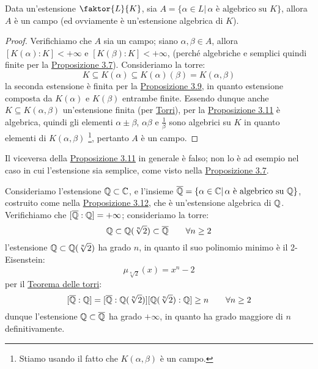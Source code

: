 \documentclass[11pt]{scrartcl}
\begin{document}
\begin{proposition}
    \label{3.12}
    Data un'estensione $\faktor{L}{K}$, sia $A = \{\alpha \in L | \, \text{$\alpha$ è algebrico su $K$}\}$, allora $A$ è un campo (ed ovviamente
    è un'estensione algebrica di $K$).
\end{proposition}

\begin{proof}
    Verifichiamo che $A$ sia un campo; siano $\alpha,\beta \in A$, allora $[K(\alpha):K] <+\infty$ e $[K(\beta):K]<+\infty$,
    (perché algebriche e semplici quindi finite per la \hyperref[3.7]{Proposizione 3.7}). Consideriamo la torre:
    \[ K \subseteq K(\alpha) \subseteq K(\alpha)(\beta) = K(\alpha,\beta)
        \]
    la seconda estensione è finita per la \hyperref[3.9]{Proposizione 3.9}, in quanto estensione composta da $K(\alpha)$ e $K(\beta)$ entrambe finite.
    Essendo dunque anche $K \subseteq K(\alpha,\beta)$ un'estensione finita (per \hyperref[torri]{Torri}), per la \hyperref[3.11]{Proposizione 3.11}
    è algebrica, quindi gli elementi $\alpha\pm\beta$, $\alpha\beta$ e $\displaystyle\frac{1}{\beta}$ sono algebrici su $K$ in quanto elementi di $K(\alpha,\beta)$ 
    \footnote{Stiamo usando il fatto che $K(\alpha,\beta)$ è un campo.}, pertanto $A$ è un campo.
\end{proof}

\begin{remark}
    Il viceversa della \hyperref[3.11]{Proposizione 3.11} in generale è falso; non lo è ad esempio nel caso in cui l'estensione sia semplice, come visto nella \hyperref[3.7]{Proposizione 3.7}.
\end{remark}

\begin{example}
    Consideriamo l'estensione $\mathbb Q \subset \mathbb C$, e l'insieme $\overline{\mathbb Q} = \{\alpha \in \mathbb C | \, \text{$\alpha$ è algebrico su $\mathbb Q$}\}$, costruito come nella \hyperref[3.12]{Proposizione 3.12},
    che è un'estensione algebrica di $\mathbb Q$. Verifichiamo che $[\overline{\mathbb Q}:\mathbb Q] = +\infty$; consideriamo la torre:
    \[ \mathbb Q \subset \mathbb Q(\sqrt[n]{2}) \subset \overline {\mathbb Q} \qquad \forall n \geq 2
        \]
    l'estensione $\mathbb Q \subset \mathbb Q(\sqrt[n]{2})$ ha grado $n$, in quanto il suo polinomio minimo è il 2-Eisenstein:
    \[ \mu_{\sqrt[n]{2}}(x) = x^n - 2
        \]
    per il \hyperref[torri]{Teorema delle torri}:
    \[ [\overline {\mathbb Q}: \mathbb Q] = [\overline {\mathbb Q}: \mathbb Q(\sqrt[n]{2})] [\mathbb Q(\sqrt[n]{2}) : \mathbb Q] \geq n \qquad \forall n \geq 2
        \]
    dunque l'estensione $\mathbb Q \subset \overline{\mathbb Q}$ ha grado $+\infty$, in quanto ha grado maggiore di $n$ definitivamente.
\end{example}
\end{document}
